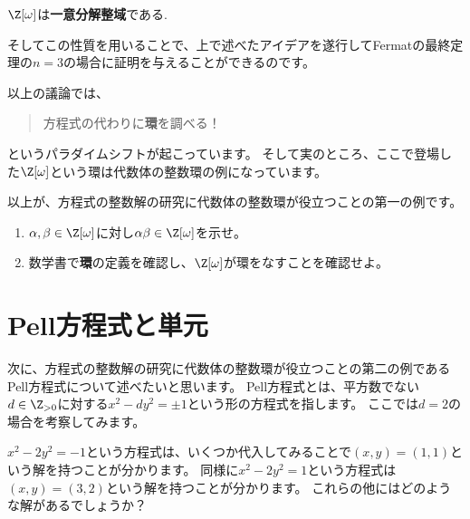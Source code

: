 \documentclass[11pt,b5paper,oneside,titlepage,lualatex]{ltjsreport}
\begin{document}
\begin{theorem}{\cite[定理8.6.1]{Yukie1}}{}
	$ \Z[\omega] $は\textbf{一意分解整域}である.
\end{theorem}

そしてこの性質を用いることで、上で述べたアイデアを遂行してFermatの最終定理の$ n=3 $の場合に証明を与えることができるのです。

以上の議論では、
\begin{quote}
	\centering
	方程式の代わりに\textbf{環}を調べる！
\end{quote}
というパラダイムシフトが起こっています。
そして実のところ、ここで登場した$ \Z[\omega] $という環は代数体の整数環の例になっています。

以上が、方程式の整数解の研究に代数体の整数環が役立つことの第一の例です。

\begin{exercise}{}{}
	\begin{enumerate}
		\item $ \alpha, \beta \in \Z[\omega] $に対し$ \alpha \beta \in \Z[\omega] $を示せ。
		\item 数学書で\textbf{環}の定義を確認し、$ \Z[\omega] $が環をなすことを確認せよ。
	\end{enumerate}
\end{exercise}


\section{Pell方程式と単元} \label{sec:Pell方程式と単元}


次に、方程式の整数解の研究に代数体の整数環が役立つことの第二の例であるPell方程式について述べたいと思います。
Pell方程式とは、平方数でない$ d \in \Z_{>0} $に対する$ x^2 - dy^2 = \pm 1 $という形の方程式を指します。
ここでは$ d = 2 $の場合を考察してみます。

$ x^2 - 2y^2 = -1 $という方程式は、いくつか代入してみることで$ (x, y) = (1, 1) $という解を持つことが分かります。
同様に$ x^2 - 2y^2 = 1 $という方程式は$ (x, y) = (3, 2) $という解を持つことが分かります。
これらの他にはどのような解があるでしょうか？
\end{document}
